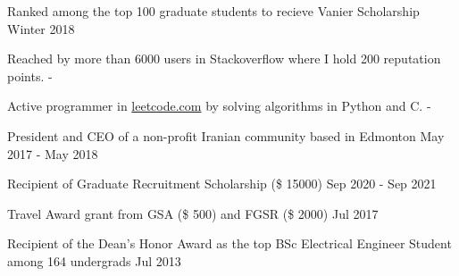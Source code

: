 \documentclass[letter,11pt]{article}
\begin{document}
Ranked among the top 100 graduate students to recieve Vanier Scholarship	\hfill Winter 2018

Reached by more than 6000 users in Stackoverflow where I hold 200 reputation points. \hfill -

Active programmer in \href{www.leetcode.com}{leetcode.com}  by solving algorithms in Python and C. \hfill -

President and CEO of a non-profit Iranian community based in Edmonton \hfill May 2017 - May 2018

Recipient of Graduate Recruitment Scholarship (\$ 15000) \hfill Sep 2020 - Sep 2021

Travel Award grant from GSA (\$ 500) and FGSR (\$ 2000) \hfill Jul 2017

Recipient of the Dean's Honor Award as the top BSc Electrical Engineer Student among 164 undergrads \hfill Jul 2013
\end{document}
